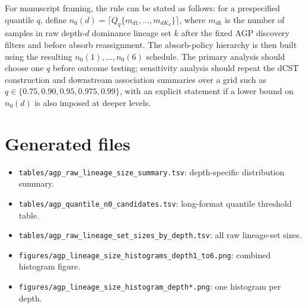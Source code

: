 \documentclass[11pt]{article}
\begin{document}
For manuscript framing, the rule can be stated as follows: for a prespecified quantile $q$, define $n_0(d)=\lceil Q_q\{m_{d1},\ldots,m_{dK_d}\}\rceil$, where $m_{dk}$ is the number of samples in raw depth-$d$ dominance lineage set $k$ after the fixed AGP discovery filters and before absorb reassignment. The absorb-policy hierarchy is then built using the resulting $n_0(1),\ldots,n_0(6)$ schedule. The primary analysis should choose one $q$ before outcome testing; sensitivity analysis should repeat the dCST construction and downstream association summaries over a grid such as $q\in\{0.75,0.90,0.95,0.975,0.99\}$, with an explicit statement if a lower bound on $n_0(d)$ is also imposed at deeper levels.

\section*{Generated files}
\begin{itemize}
\item \texttt{tables/agp\_raw\_lineage\_size\_summary.tsv}: depth-specific distribution summary.
\item \texttt{tables/agp\_quantile\_n0\_candidates.tsv}: long-format quantile threshold table.
\item \texttt{tables/agp\_raw\_lineage\_set\_sizes\_by\_depth.tsv}: all raw lineage-set sizes.
\item \texttt{figures/agp\_lineage\_size\_histograms\_depth1\_to6.png}: combined histogram figure.
\item \texttt{figures/agp\_lineage\_size\_histogram\_depth*.png}: one histogram per depth.
\end{itemize}
\end{document}
